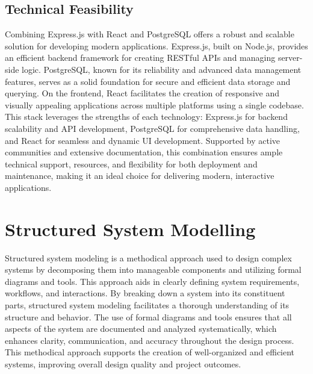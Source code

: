 \subsection{Technical Feasibility}
Combining Express.js with React and PostgreSQL offers a robust and scalable solution for developing modern applications. Express.js, built on Node.js, provides an efficient backend framework for creating RESTful APIs and managing server-side logic. PostgreSQL, known for its reliability and advanced data management features, serves as a solid foundation for secure and efficient data storage and querying. On the frontend, React facilitates the creation of responsive and visually appealing applications across multiple platforms using a single codebase. This stack leverages the strengths of each technology: Express.js for backend scalability and API development, PostgreSQL for comprehensive data handling, and React for seamless and dynamic UI development. Supported by active communities and extensive documentation, this combination ensures ample technical support, resources, and flexibility for both deployment and maintenance, making it an ideal choice for delivering modern, interactive applications.
\section{Structured System Modelling }
Structured system modeling is a methodical approach used to design complex systems by decomposing them into manageable components and utilizing formal diagrams and tools. This approach aids in clearly defining system requirements, workflows, and interactions. By breaking down a system into its constituent parts, structured system modeling facilitates a thorough understanding of its structure and behavior. The use of formal diagrams and tools ensures that all aspects of the system are documented and analyzed systematically, which enhances clarity, communication, and accuracy throughout the design process. This methodical approach supports the creation of well-organized and efficient systems, improving overall design quality and project outcomes.
\newpage
